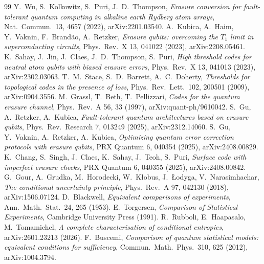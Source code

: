 \begin{thebibliography}{99}
 Y.~Wu, S.~Kolkowitz, S.~Puri, J.~D.~Thompson, \emph{Erasure conversion for fault-tolerant quantum computing in alkaline earth Rydberg atom arrays}, Nat.\ Commun.\ 13, 4657 (2022), arXiv:2201.03540. %
 A.~Kubica, A.~Haim, Y.~Vaknin, F.~Brand\~ao, A.~Retzker, \emph{Erasure qubits: overcoming the $T_1$ limit in superconducting circuits}, Phys.\ Rev.\ X 13, 041022 (2023), arXiv:2208.05461. %
 K.~Sahay, J.~Jin, J.~Claes, J.~D.~Thompson, S.~Puri, \emph{High threshold codes for neutral atom qubits with biased erasure errors}, Phys.\ Rev.\ X 13, 041013 (2023), arXiv:2302.03063. %
 T.~M.~Stace, S.~D.~Barrett, A.~C.~Doherty, \emph{Thresholds for topological codes in the presence of loss}, Phys.\ Rev.\ Lett.\ 102, 200501 (2009), arXiv:0904.3556. %
 M.~Grassl, T.~Beth, T.~Pellizzari, \emph{Codes for the quantum erasure channel}, Phys.\ Rev.\ A 56, 33 (1997), arXiv:quant-ph/9610042. %
 S.~Gu, A.~Retzker, A.~Kubica, \emph{Fault-tolerant quantum architectures based on erasure qubits}, Phys.\ Rev.\ Research 7, 013249 (2025), arXiv:2312.14060. %
 S.~Gu, Y.~Vaknin, A.~Retzker, A.~Kubica, \emph{Optimizing quantum error correction protocols with erasure qubits}, PRX Quantum 6, 040354 (2025), arXiv:2408.00829. %
 K.~Chang, S.~Singh, J.~Claes, K.~Sahay, J.~Teoh, S.~Puri, \emph{Surface code with imperfect erasure checks}, PRX Quantum 6, 040355 (2025), arXiv:2408.00842. %
 G.~Gour, A.~Grudka, M.~Horodecki, W.~K\l{}obus, J.~\L{}odyga, V.~Narasimhachar, \emph{The conditional uncertainty principle}, Phys.\ Rev.\ A 97, 042130 (2018), arXiv:1506.07124. %
 D.~Blackwell, \emph{Equivalent comparisons of experiments}, Ann.\ Math.\ Stat.\ 24, 265 (1953). %
 E.~Torgersen, \emph{Comparison of Statistical Experiments}, Cambridge University Press (1991). %
 R.~Rubboli, E.~Haapasalo, M.~Tomamichel, \emph{A complete characterisation of conditional entropies}, arXiv:2601.23213 (2026). %
 F.~Buscemi, \emph{Comparison of quantum statistical models: equivalent conditions for sufficiency}, Commun.\ Math.\ Phys.\ 310, 625 (2012), arXiv:1004.3794. %

\end{thebibliography}
